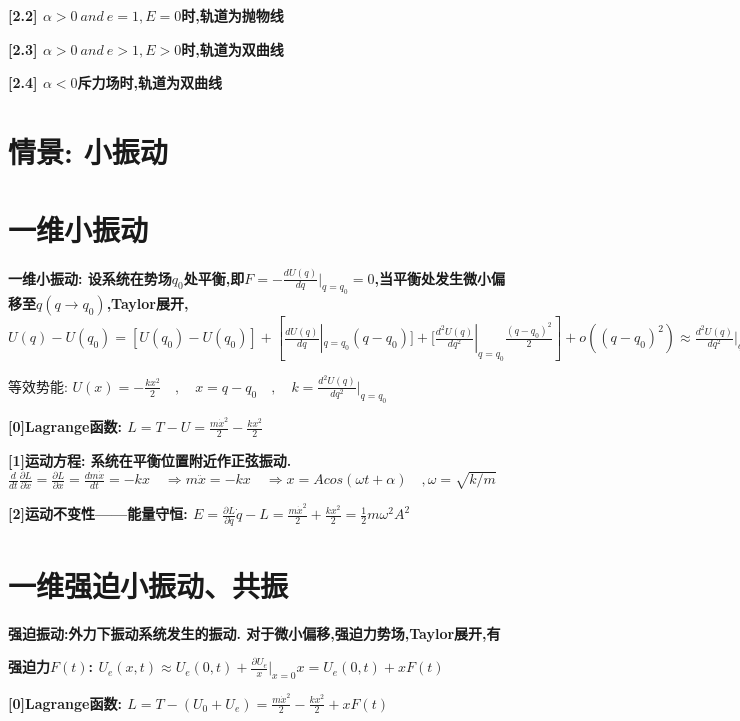         \bf{[2.2] $\alpha > 0\ and\ e=1, E=0$时,轨道为抛物线}
        
        \bf{[2.3] $\alpha > 0\ and\ e>1, E>0$时,轨道为双曲线}
        
        \bf{[2.4] $\alpha < 0$斥力场时,轨道为双曲线}



    \section{情景: 小振动}
        \section{一维小振动}
            \bf{一维小振动}:
                设系统在势场$q_0$处平衡,即$F = -\frac{dU(q)}{dq}|_{q=q_0} = 0$,当平衡处发生微小偏移至$q(q\to q_0)$,Taylor展开,
                $U(q) - U(q_0) = [U(q_0) - U(q_0)] + [\frac{d U(q)}{dq}|_{q=q_0} (q - q_0)]+ [\frac{d^2 U(q)}{dq^2}|_{q=q_0} \frac{(q - q_0)^2}{2}] + o((q - q_0)^2) \approx \frac{d^2 U(q)}{dq^2}|_{q=q_0} \frac{(q - q_0)^2}{2}$
            
            等效势能:
            $U(x) = - \frac{k x^2}{2} \quad , \quad x = q-q_0 \quad ,\quad k = \frac{d^2 U(q)}{dq^2}|_{q=q_0}$
            
            \bf{[0]Lagrange函数}:
            $L = T - U = \frac{m \dot x^2}{2} - \frac{k x^2}{2}$
            
            \bf{[1]运动方程}: 系统在平衡位置附近作正弦振动.
            $\frac{d}{dt} \frac{\partial L}{\partial \dot x} = \frac{\partial L}{\partial x} = \frac{d m\dot x}{dt} = -kx \quad \Rightarrow m \ddot x = -kx \quad \Rightarrow x = A cos(\omega t + \alpha) \quad , \omega = \sqrt{k/m}$
            
            \bf{[2]运动不变性——能量守恒}:
            $E = \frac{\partial L}{\partial \dot q}\dot q - L = \frac{m \dot x^2}{2} + \frac{k x^2}{2} = \frac{1}{2} m \omega^2 A^2$


        \section{一维强迫小振动、共振}
            \bf{强迫振动}:外力下振动系统发生的振动. 对于微小偏移,强迫力势场,Taylor展开,有
            
            \bf{强迫力$F(t)$}:
                $U_e(x,t) \approx U_e(0,t) + \frac{\partial U_e}{x}|_{x=0}x = U_e(0,t) + xF(t)$
            
            \bf{[0]Lagrange函数}:
                $L = T - (U_0 + U_e) = \frac{m \dot x^2}{2} - \frac{k x^2}{2} + xF(t)$
            
